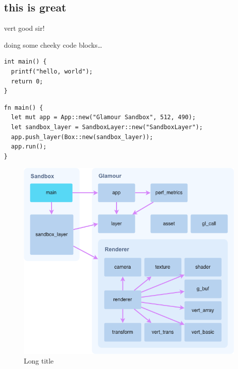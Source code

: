 \subsection{this is great}
vert good sir!

doing some cheeky code blocks\ldots

\begin{verbatim}
int main() {
  printf("hello, world");
  return 0;
}
\end{verbatim}

\begin{verbatim}
fn main() {
  let mut app = App::new("Glamour Sandbox", 512, 490);
  let sandbox_layer = SandboxLayer::new("SandboxLayer");
  app.push_layer(Box::new(sandbox_layer));
  app.run();
}
\end{verbatim}

\begin{figure}\centering
  \includegraphics[width=1\columnwidth]{module-graph.png}
  \caption[Short title]{Long title}\label{fig:ff}
\end{figure}


